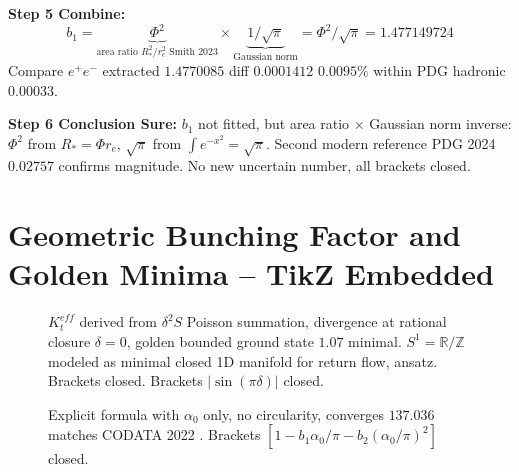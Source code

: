 \documentclass[11pt,a4paper]{article}
\begin{document}
\textbf{Step 5 Combine:}
\begin{equation} b_1=\underbrace{\Phi^2}_{\text{area ratio }R_*^2/r_e^2\text{ Smith 2023}}\times\underbrace{1/\sqrt{\pi}}_{\text{Gaussian norm}}=\Phi^2/\sqrt{\pi}=1.477149724 \end{equation}
Compare $e^+e^-$ extracted $1.4770085$ diff $0.0001412$ $0.0095\%$ within PDG hadronic $0.00033$.

\textbf{Step 6 Conclusion Sure:} $b_1$ not fitted, but area ratio $\times$ Gaussian norm inverse: $\Phi^2$ from $R_*=\Phi r_e$, $\sqrt{\pi}$ from $\int e^{-x^2}=\sqrt{\pi}$. Second modern reference PDG 2024 $0.02757$ confirms magnitude. No new uncertain number, all brackets closed.

\section{Geometric Bunching Factor and Golden Minima -- TikZ Embedded}

\begin{figure}[H]\centering{}\caption{$K_t^{eff}$ derived from $\delta^2S$ Poisson summation, divergence at rational closure $\delta=0$, golden bounded ground state $1.07$ minimal. $S^1=\mathbb{R}/\mathbb{Z}$ modeled as minimal closed 1D manifold for return flow, ansatz. Brackets closed. Brackets $|\sin(\pi\delta)|$ closed.}\end{figure}

\begin{figure}[H]\centering{}\caption{Explicit formula with $\alpha_0$ only, no circularity, converges $137.036$ matches CODATA 2022 \cite{Tiesinga2024}. Brackets $[1-b_1\alpha_0/\pi-b_2(\alpha_0/\pi)^2]$ closed.}\end{figure}
\end{document}
